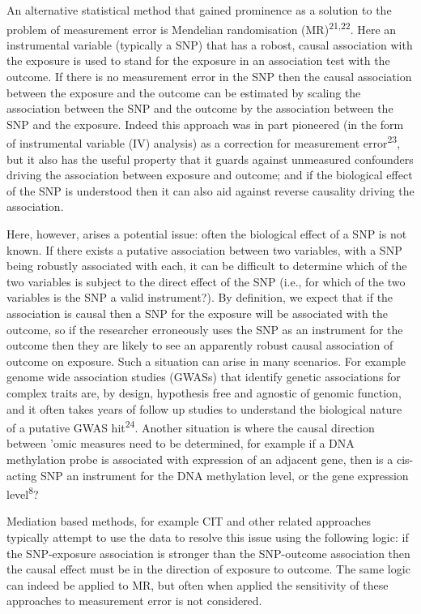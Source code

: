 \documentclass[]{article}
\begin{document}
An alternative statistical method that gained prominence as a solution
to the problem of measurement error is Mendelian randomisation
(MR)\textsuperscript{21,22}. Here an instrumental variable (typically a
SNP) that has a robost, causal association with the exposure is used to
stand for the exposure in an association test with the outcome. If there
is no measurement error in the SNP then the causal association between
the exposure and the outcome can be estimated by scaling the association
between the SNP and the outcome by the association between the SNP and
the exposure. Indeed this approach was in part pioneered (in the form of
instrumental variable (IV) analysis) as a correction for measurement
error\textsuperscript{23}, but it also has the useful property that it
guards against unmeasured confounders driving the association between
exposure and outcome; and if the biological effect of the SNP is
understood then it can also aid against reverse causality driving the
association.

Here, however, arises a potential issue: often the biological effect of
a SNP is not known. If there exists a putative association between two
variables, with a SNP being robustly associated with each, it can be
difficult to determine which of the two variables is subject to the
direct effect of the SNP (i.e., for which of the two variables is the
SNP a valid instrument?). By definition, we expect that if the
association is causal then a SNP for the exposure will be associated
with the outcome, so if the researcher erroneously uses the SNP as an
instrument for the outcome then they are likely to see an apparently
robust causal association of outcome on exposure. Such a situation can
arise in many scenarios. For example genome wide association studies
(GWASs) that identify genetic associations for complex traits are, by
design, hypothesis free and agnostic of genomic function, and it often
takes years of follow up studies to understand the biological nature of
a putative GWAS hit\textsuperscript{24}. Another situation is where the
causal direction between 'omic measures need to be determined, for
example if a DNA methylation probe is associated with expression of an
adjacent gene, then is a cis-acting SNP an instrument for the DNA
methylation level, or the gene expression level\textsuperscript{8}?

Mediation based methods, for example CIT and other related approaches
typically attempt to use the data to resolve this issue using the
following logic: if the SNP-exposure association is stronger than the
SNP-outcome association then the causal effect must be in the direction
of exposure to outcome. The same logic can indeed be applied to MR, but
often when applied the sensitivity of these approaches to measurement
error is not considered.
\end{document}
